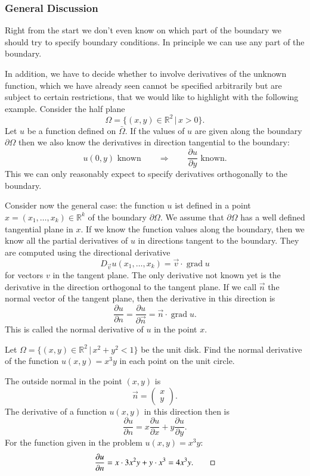 \subsubsection{General Discussion}
Right from the start we don't even know on which part of the boundary
we should try to specify boundary conditions.
In principle we can use any part of the boundary.

In addition, we have to decide whether to involve derivatives of the
unknown function, which we have already seen cannot be specified
arbitrarily but are subject to certain restrictions, that we would like
to highlight with the following example.
Consider the half plane
\[
\Omega=\{(x,y)\in\mathbb R^2\,|\,x>0\}.
\]
Let $u$ be a function defined on $\bar\Omega$.
If the values of $u$ are given along the boundary $\partial\Omega$
then we also know the derivatives in direction tangential to the boundary:
\[
\text{
$u(0,y)$ known
}\qquad\Rightarrow\qquad
\text{$\frac{\partial u}{\partial y}$ known.}
\]
This we can only reasonably expect to specify derivatives orthogonally
to the boundary.

Consider now the general case: the function $u$ ist defined in a point 
$x=(x_1,\dots,x_k)\in\mathbb R^k$ of the boundary $\partial\Omega$.
We assume that $\partial \Omega$ has a well defined tangential plane
in $x$.
If we know the function values along the boundary, then we know all the
partial derivatives of $u$ in directions tangent to the boundary.
They are computed using the directional derivative
\[
D_{\vec v}u(x_1,\dots,x_k)=\vec v\cdot\operatorname{grad}u
\]
for vectors $v$ in the tangent plane.
The only derivative not known yet is the derivative in the direction
orthogonal to the tangent plane.
If we call $\vec{n}$ the normal vector of the tangent plane, then the
derivative in this direction is
\[
\frac{\partial u}{\partial n}
=
\frac{\partial u}{\partial \vec{n}}
=
\vec{n}\cdot \operatorname{grad}u .
\]
This is called the normal derivative of $u$ in the point $x$.

\begin{beispiel}
Let $\Omega=\{(x,y)\in\mathbb R^2\,|\,x^2+y^2<1\}$ be the unit disk.
Find the normal derivative of the function
$u(x,y)=x^3y$
in each point on the unit circle.

The outside normal in the point $(x,y)$ is
\[
\vec n=\begin{pmatrix}x\\y\end{pmatrix}.
\]
The derivative of a function $u(x,y)$
in this direction then is
\[
\frac{\partial u}{\partial n}=
x\frac{\partial u}{\partial x}
+
y\frac{\partial u}{\partial y}.
\]
For the function given in the problem $u(x,y)=x^3y$:
\[
\frac{\partial u}{\partial n}
=
x\cdot 3x^2y+y\cdot x^3=
4x^3y.
\qedhere
\]
\end{beispiel}

